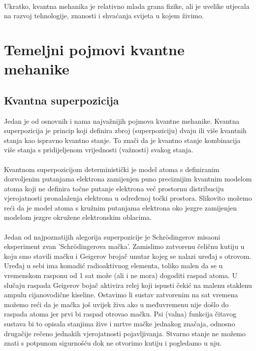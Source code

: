 \documentclass[times, utf8, zavrsni, numeric]{fer}
\begin{document}
\paragraph{}
Ukratko, kvantna mehanika je relativno mlada grana fizike, ali je uvelike utjecala na razvoj tehnologije, znanosti i shvaćanja svijeta u kojem živimo.

\section{Temeljni pojmovi kvantne mehanike}

\subsection{Kvantna superpozicija}
Jedan je od osnovnih i nama najvažnijih pojmova kvantne mehanike.
Kvantna superpozicija je princip koji definira zbroj (superpoziciju) dvaju ili više kvantnih stanja kao ispravno kvantno stanje. 
To znači da je kvantno stanje kombinacija više stanja s pridijeljenom vrijednosti (važnosti) svakog stanja.

\paragraph{}
Kvantnom superpozicijom deterministički je model atoma s definiranim dozvoljenim putanjama elektrona zamijenjen puno preciznijim kvantnim modelom atoma koji ne definira točne putanje elektrona već prostornu distribuciju vjerojatnosti pronalaženja elektrona u određenoj točki prostora. Slikovito možemo reći da je model atoma s kružnim putanjama elektrona oko jezgre zamijenjen modelom jezgre okružene elektronskim oblacima. \citep{bozja_cestica}

\paragraph{}
Jedan od najpoznatijih alegorija superpozicije je Schr\"odingerov misaoni eksperiment zvan 'Schr\"odingerova mačka'. Zamislimo zatvorenu čeličnu kutiju u koju smo stavili mačku i Geigerov brojač unutar kojeg se nalazi uređaj s otrovom. Uređaj u sebi ima komadić radioaktivnog elementa, toliko malen da se u vremenskom rasponu od 1 sat može (ali i ne mora) dogoditi raspad atoma. U slučaju raspada Geigerov bojač aktivira relej koji ispusti čekić na malenu staklenu ampulu cijanovodične kiseline.
Ostavimo li sustav zatvorenim na sat vremena možemo reći da je mačka još uvijek živa ako u međuvremenu nije došlo do raspada atoma jer prvi bi raspad otrovao mačku. Psi (valna) funkcija čitavog sustava bi to opisala stanjima žive i mrtve mačke jednakog značaja, odnosno drugačije rečeno jednakih vjerojatnosti pojavljivanja.
Stvarno stanje ne možemo znati s potpunom sigurnošću dok ne otvorimo kutiju i pogledamo u nju.
\end{document}
